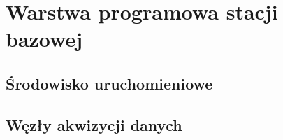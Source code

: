 
\chapter{Warstwa programowa stacji bazowej}
\label{chap:oprogramowanie}

\section{Środowisko uruchomieniowe}
\label{sec:srodowisko}

\section{Węzły akwizycji danych}
\label{sec:akwizycja}
